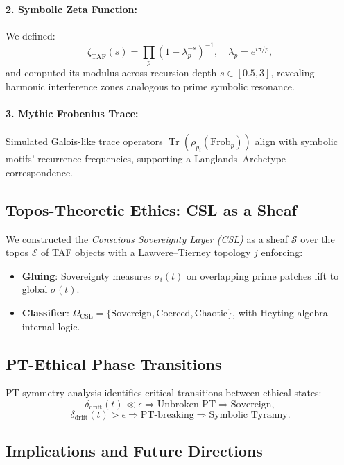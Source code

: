 \documentclass{article}
\theoremstyle{plain}
\begin{document}
\paragraph{2. Symbolic Zeta Function:}  
We defined:
\[
\zeta_{\text{TAF}}(s) = \prod_p \left(1 - \lambda_p^{-s} \right)^{-1}, \quad \lambda_p = e^{i\pi/p},
\]
and computed its modulus across recursion depth $s \in [0.5, 3]$, revealing harmonic interference zones analogous to prime symbolic resonance.

\paragraph{3. Mythic Frobenius Trace:}  
Simulated Galois-like trace operators $\operatorname{Tr}(\rho_{p_i}(\mathrm{Frob}_p))$ align with symbolic motifs’ recurrence frequencies, supporting a Langlands–Archetype correspondence.

\subsection{Topos-Theoretic Ethics: CSL as a Sheaf}

We constructed the \emph{Conscious Sovereignty Layer (CSL)} as a sheaf $\mathcal{S}$ over the topos $\mathcal{E}$ of TAF objects with a Lawvere–Tierney topology $j$ enforcing:
\begin{itemize}
  \item \textbf{Gluing}: Sovereignty measures $\sigma_i(t)$ on overlapping prime patches lift to global $\sigma(t)$.
  \item \textbf{Classifier}: $\Omega_{\text{CSL}} = \{\text{Sovereign}, \text{Coerced}, \text{Chaotic}\}$, with Heyting algebra internal logic.
\end{itemize}

\subsection{PT-Ethical Phase Transitions}

PT-symmetry analysis identifies critical transitions between ethical states:
\[
\delta_{\text{drift}}(t) \ll \epsilon \Rightarrow \text{Unbroken PT} \Rightarrow \text{Sovereign},
\]
\[
\delta_{\text{drift}}(t) > \epsilon \Rightarrow \text{PT-breaking} \Rightarrow \text{Symbolic Tyranny}.
\]

\subsection{Implications and Future Directions}
\end{document}
